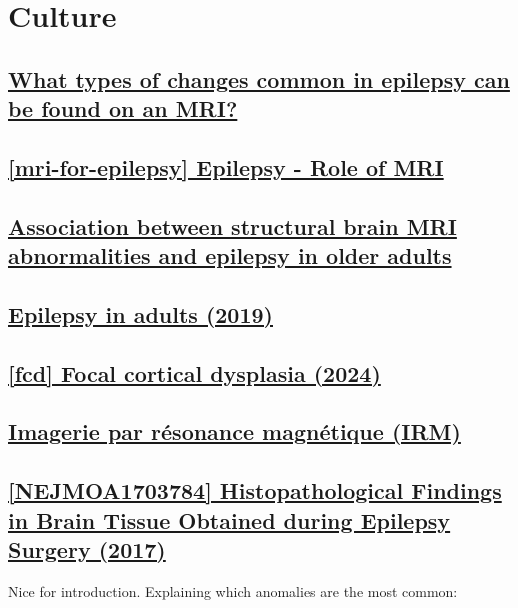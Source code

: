 \chapter{Culture} 

\section{\href{https://www.epilepsy.com/diagnosis/brain-imaging/mri}{What types of changes common in epilepsy can be found on an MRI?}}

\section{\href{https://radiologyassistant.nl/neuroradiology/epilepsy/role-of-mri}{[mri-for-epilepsy] Epilepsy - Role of MRI }}

\section{\href{https://onlinelibrary.wiley.com/doi/10.1002/acn3.51955}{Association between structural brain MRI abnormalities and epilepsy in older adults}}

\section{\href{https://www.sciencedirect.com/science/article/abs/pii/S0140673618325960}{Epilepsy in adults (2019)}}

\section{\href{https://radiopaedia.org/articles/focal-cortical-dysplasia}{[fcd] Focal cortical dysplasia (2024) }}

\section{\href{https://info-radiologie.ch/resonance_magnetique.php}{Imagerie par résonance magnétique (IRM)}}

\section{\href{https://www.nejm.org/doi/10.1056/NEJMoa1703784}{[NEJMOA1703784] Histopathological Findings in Brain Tissue Obtained during Epilepsy Surgery (2017)}}

Nice for introduction. Explaining which anomalies are the most common: 


